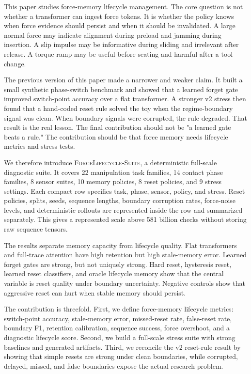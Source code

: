 \documentclass{article}
\newcommand{\suite}{\textsc{ForceLifecycle-Suite}}
\begin{document}
This paper studies force-memory lifecycle management. The core question is not
whether a transformer can ingest force tokens. It is whether the policy knows
when force evidence should persist and when it should be invalidated. A large
normal force may indicate alignment during preload and jamming during insertion.
A slip impulse may be informative during sliding and irrelevant after release.
A torque ramp may be useful before seating and harmful after a tool change.

The previous version of this paper made a narrower and weaker claim. It built a
small synthetic phase-switch benchmark and showed that a learned forget gate
improved switch-point accuracy over a flat transformer. A stronger v2 stress
then found that a hand-coded reset rule solved the toy when the regime-boundary
signal was clean. When boundary signals were corrupted, the rule degraded. That
result is the real lesson. The final contribution should not be "a learned gate
beats a rule." The contribution should be that force memory needs lifecycle
metrics and stress tests.

We therefore introduce \suite{}, a deterministic full-scale diagnostic suite.
It covers 22 manipulation task families, 14 contact phase families, 8 sensor
suites, 10 memory policies, 8 reset policies, and 9 stress settings. Each
compact row specifies task, phase, sensor, policy, and stress. Reset policies,
splits, seeds, sequence lengths, boundary corruption rates, force-noise levels,
and deterministic rollouts are represented inside the row and summarized
separately. This gives a represented scale above 581 billion checks without
storing raw sequence tensors.

The results separate memory capacity from lifecycle quality. Flat transformers
and full-trace attention have high retention but high stale-memory error.
Learned forget gates are strong, but not uniquely strong. Hard reset, hysteresis
reset, learned reset classifiers, and oracle lifecycle memory show that the
central variable is reset quality under boundary uncertainty. Negative controls
show that aggressive reset can hurt when stable memory should persist.

The contribution is threefold. First, we define force-memory lifecycle metrics:
switch-point accuracy, stale-memory error, missed-reset rate, false-reset rate,
boundary F1, retention calibration, sequence success, force overshoot, and a
diagnostic lifecycle score. Second, we build a full-scale stress suite with
strong baselines and generated artifacts. Third, we reconcile the v2 reset-rule
result by showing that simple resets are strong under clean boundaries, while
corrupted, delayed, missed, and false boundaries expose the actual research
problem.
\end{document}
